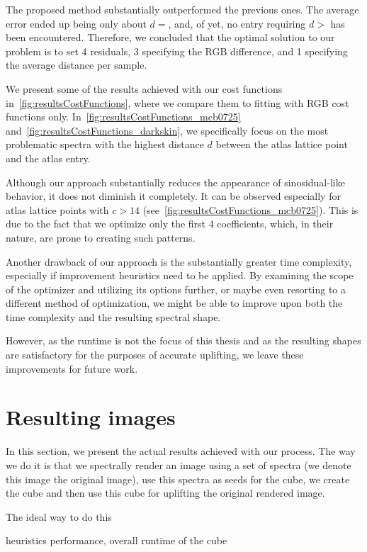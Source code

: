 The proposed method substantially outperformed the previous ones. The average error ended up being only about $d = $, and, of yet, no entry requiring $d > $ has been encountered. Therefore, we concluded that the optimal solution to our problem is to set 4 residuals, 3 specifying the RGB difference, and 1 specifying the average distance per sample.

We present some of the results achieved with our cost functions in~\cref{fig:resultsCostFunctions}, where we compare them to fitting with RGB cost functions only. In~\cref{fig:resultsCostFunctions_mcb0725} and~\cref{fig:resultsCostFunctions_darkskin}, we specifically focus on the most problematic spectra with the highest distance $d$ between the atlas lattice point and the atlas entry.

Although our approach substantially reduces the appearance of sinosidual-like behavior, it does not diminish it completely. It can be observed especially for atlas lattice points with $c > 14$ (see~\cref{fig:resultsCostFunctions_mcb0725}). This is due to the fact that we optimize only the first 4 coefficients, which, in their nature, are prone to creating such patterns.

Another drawback of our approach is the substantially greater time complexity, especially if improvement heuristics need to be applied. By examining the scope of the optimizer and utilizing its options further, or maybe even resorting to a different method of optimization, we might be able to improve upon both the time complexity and the resulting spectral shape.

However, as the runtime is not the focus of this thesis and as the resulting shapes are satisfactory for the purposes of accurate uplifting, we leave these improvements for future work.

\section{Resulting images}

In this section, we present the actual results achieved with our process. The way we do it is that
we spectrally render an image using a set of spectra (we denote this image the original image), use this spectra as seeds for the cube, we create the cube and then use this cube for uplifting the original rendered image. 

The ideal way to do this

heuristics performance, overall runtime of the cube

